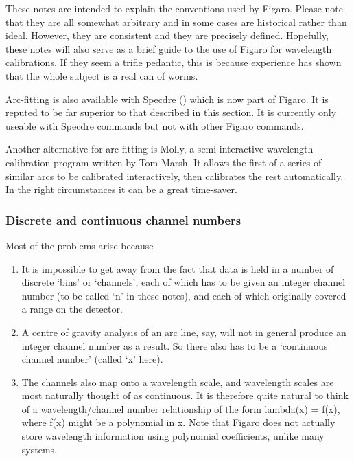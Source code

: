    These notes are intended to explain the conventions used by Figaro.
   Please note that they are all somewhat arbitrary and in some cases
   are historical rather than ideal. However, they are consistent and
   they are precisely defined. Hopefully, these notes will also serve as
   a brief guide to the use of Figaro for wavelength calibrations.  If
   they seem a trifle pedantic, this is because experience has shown
   that the whole subject is a real can of worms.

   Arc-fitting is also available with Specdre
   {()}
   which is now part of Figaro. 
   It is reputed to be far superior to that described in this section. 
   It is currently only useable with Specdre commands but not with other 
   Figaro commands.

   Another alternative for arc-fitting is
   Molly, a semi-interactive wavelength calibration program written
   by Tom Marsh. It allows the first of a series of similar arcs to be
   calibrated interactively, then calibrates the rest automatically. In
   the right circumstances it can be a great time-saver.


\subsubsection{\label{techno8channels}Discrete and continuous channel numbers}

   Most of the problems arise because

\begin{enumerate}
\item
   It is impossible to get away from the fact that data is held in a
   number of discrete `bins' or `channels', each of which has to be
   given an integer channel number (to be called `n' in these notes),
   and each of which originally covered a range on the detector.
\item
   A centre of gravity analysis of an arc line, say, will not in
   general produce an integer channel number as a result.  So there also
   has to be a `continuous channel number' (called `x' here).
\item
   The channels also map onto a wavelength scale, and wavelength
   scales are most naturally thought of as continuous.  It is therefore
   quite natural to think of a wavelength/channel number relationship of
   the form lambda(x) = f(x), where f(x) might be a polynomial in x.
   Note that Figaro does not actually store wavelength information using
   polynomial coefficients, unlike many systems.
\end{enumerate}

